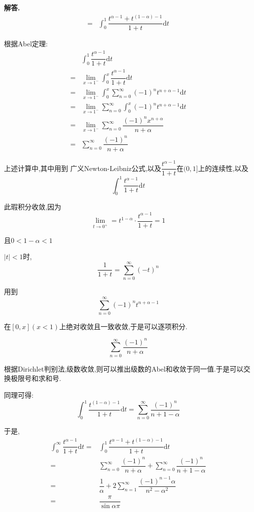 \documentclass[12pt, a4paper, oneside]{ctexart}
\newenvironment{solution}{\par\noindent\textbf{解答. }}{\par}
\begin{document}
\begin{solution}
$$\begin{aligned}
=&\int_{0}^{1}\dfrac{t^{\alpha-1}+t^{(1-\alpha)-1}}{1+t}\mathrm{d}t
\end{aligned}
$$
\par
根据Abel定理:
$$
\begin{aligned}
&\int_{0}^{1}\dfrac{t^{\alpha-1}}{1+t}\mathrm{d}t\\
=&\lim_{x \to 1^-}\int_{0}^{x}\dfrac{t^{\alpha-1}}{1+t}\mathrm{d}t\\
=&\lim_{x\to 1^-}\int_{0}^{x}\sum_{n=0}^{\infty}(-1)^nt^{n+\alpha-1}\mathrm{d}t\\
=&\lim_{x\to 1^-}\sum_{n=0}^{\infty}\int_{0}^{x}(-1)^nt^{n+\alpha-1}\mathrm{d}t\\
=&\lim_{x\to 1^-}\sum_{n=0}^{\infty}\dfrac{(-1)^nx^{n+\alpha}}{n+\alpha}\\
=&\sum_{n=0}^{\infty}\dfrac{(-1)^n}{n+\alpha}
\end{aligned}
$$
\par
上述计算中,其中用到
广义Newton-Leibniz公式,以及$\dfrac{t^{\alpha-1}}{1+t}$在$(0,1]$上的连续性,以及
$$
\int_{0}^{1}\dfrac{t^{\alpha-1}}{1+t}\mathrm{d}t
$$
\par
此瑕积分收敛,因为
$$\lim_{t \to 0^+}=t^{1-\alpha}\cdot\dfrac{t^{\alpha-1}}{1+t}=1
$$
\par
且$0<1-\alpha<1$
\par
$|t|<1$时,
$$
\dfrac{1}{1+t}=\sum_{n=0}^{\infty}(-t)^n
$$
\par
用到$$
\sum_{n=0}^{\infty}(-1)^nt^{n+\alpha-1}
$$
\par
在$[0,x](x<1)$上绝对收敛且一致收敛,于是可以逐项积分.
\par
$$
\sum_{n=0}^{\infty}\dfrac{(-1)^n}{n+\alpha}
$$
\par
根据Dirichlet判别法,级数收敛,则可以推出级数的Abel和收敛于同一值.于是可以交换极限号和求和号.
\par
同理可得:
$$
\int_{0}^{1}\dfrac{t^{(1-\alpha)-1}}{1+t}\mathrm{d}t
=\sum_{n=0}^{\infty}\dfrac{(-1)^n}{n+1-\alpha}
$$
\par
于是,
$$
\begin{aligned}
\int_{0}^{\infty}\dfrac{t^{\alpha-1}}{1+t}\mathrm{d}t
=&\int_{0}^{1}\dfrac{t^{\alpha-1}+t^{(1-\alpha)-1}}{1+t}\mathrm{d}t\\
=&\sum_{n=0}^{\infty}\dfrac{(-1)^n}{n+\alpha}+\sum_{n=0}^{\infty}\dfrac{(-1)^n}{n+1-\alpha}\\
=&\dfrac{1}{\alpha}+2\sum_{n=1}^{\infty}\dfrac{(-1)^{n-1}\alpha}{n^2-\alpha^2}\\
=&\dfrac{\pi}{\sin \alpha \pi}
\end{aligned}
$$
\end{solution}
\end{document}
